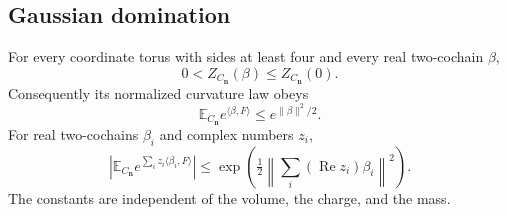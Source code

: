 \documentclass[11pt,letterpaper,reqno]{amsart}
\newcommand{\E}{\mathbb E}
\begin{document}
\subsection{Gaussian domination}\label{subsec:slab-gaussian}

\begin{proposition}\label{thm:slab-gaussian}
For every coordinate torus with sides at least four and every real
two-cochain $\beta$,
\begin{equation}\label{eq:slab-gaussian-partition}
 0<Z_{C_{\mathbf n}}(\beta)\le Z_{C_{\mathbf n}}(0).
\end{equation}
Consequently its normalized curvature law obeys
\begin{equation}\label{eq:slab-gaussian-domination}
 \E_{C_{\mathbf n}}e^{\langle\beta,F\rangle}
                              \le e^{\|\beta\|^2/2}.
\end{equation}
For real two-cochains $\beta_i$ and complex numbers $z_i$,
\begin{equation}\label{eq:slab-complex-gaussian}
 \left|\E_{C_{\mathbf n}}e^{\sum_i z_i\langle\beta_i,F\rangle}\right|
       \le\exp\left(\tfrac12
                    \left\|\sum_i(\operatorname{Re}z_i)\beta_i\right\|^2\right).
\end{equation}
The constants are independent of the volume, the charge, and the mass.
\end{proposition}
\end{document}
